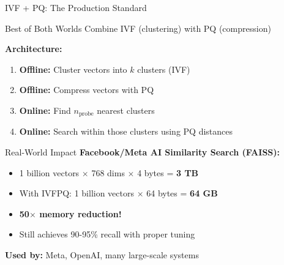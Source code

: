 \documentclass[aspectratio=169]{beamer}
\newif\ifanimated
\newcommand{\cpause}{\ifanimated\pause\fi}
\begin{document}
\begin{frame}[shrink=10]{IVF + PQ: The Production Standard}
\begin{block}{Best of Both Worlds}
Combine IVF (clustering) with PQ (compression)
\end{block}
\cpause

\vspace{1em}

\textbf{Architecture:}
\begin{enumerate}
    \item \textbf{Offline:} Cluster vectors into $k$ clusters (IVF)
    \item \textbf{Offline:} Compress vectors with PQ
    \item \textbf{Online:} Find $n_{\text{probe}}$ nearest clusters
    \item \textbf{Online:} Search within those clusters using PQ distances
\end{enumerate}

\vspace{1em}

\begin{exampleblock}{Real-World Impact}
\textbf{Facebook/Meta AI Similarity Search (FAISS):}
\begin{itemize}
    \item 1 billion vectors $\times$ 768 dims $\times$ 4 bytes = \textbf{3 TB}
    \item With IVFPQ: 1 billion vectors $\times$ 64 bytes = \textbf{64 GB}
    \item \textbf{50$\times$ memory reduction!}
    \item Still achieves 90-95\% recall with proper tuning
\end{itemize}
\end{exampleblock}
\cpause

\vspace{0.5em}

\textbf{Used by:} Meta, OpenAI, many large-scale systems
\end{frame}
\end{document}
